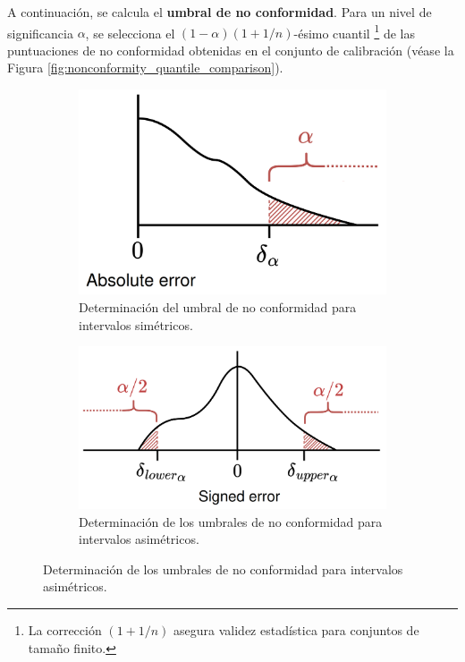 \begin{enumerate}
    A continuación, se calcula el \textbf{umbral de no conformidad}.
    Para un nivel de significancia $\alpha$, se selecciona el $(1 - \alpha)(1 + 1/n)$-ésimo cuantil%
    \footnote{
        La corrección $(1 + 1/n)$ asegura validez estadística para conjuntos de tamaño finito.
    } 
    de las puntuaciones de no conformidad obtenidas en el conjunto de calibración 
    (véase la Figura \ref{fig:nonconformity_quantile_comparison}).

    \begin{figure}[h]
        \centering

        \begin{subfigure}[b]{0.48\textwidth}
            \centering
            \includegraphics[width=\textwidth]{capitulos/cap_02/imagenes/nonconformity_quantile_threshold_simetric.png}
            \caption{Determinación del umbral de no conformidad para intervalos simétricos.}
            \label{fig:nonconformity_quantile_threshold_simetric}
        \end{subfigure}
        \hfill
        \begin{subfigure}[b]{0.49\textwidth}
            \centering
            \includegraphics[width=\textwidth]{capitulos/cap_02/imagenes/nonconformity_quantile_threshold_asimetric.png}
            \caption{Determinación de los umbrales de no conformidad para intervalos asimétricos.}
            \label{fig:nonconformity_quantile_threshold_asimetric}
        \end{subfigure}


\end{figure}
\end{enumerate}
